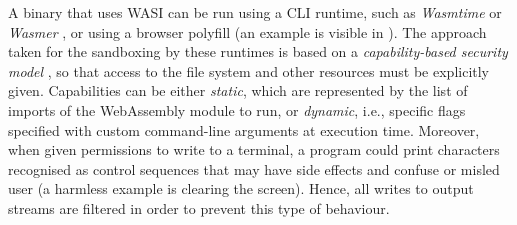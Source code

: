 A binary that uses WASI can be run using a CLI runtime, such as \textit{Wasmtime} \cite{wasmtime} or \textit{Wasmer} \cite{wasmer},
or using a browser polyfill (an example is visible in \cite{wasi-polyfill}).
The approach taken for the sandboxing by these runtimes is based on a \textit{capability-based security model} \cite{wasmtime-security-sandboxing},
so that access to the file system and other resources must be explicitly given. Capabilities can be either \textit{static}, which
are represented by the list of imports of the WebAssembly module to run, or \textit{dynamic}, i.e., specific flags
specified with custom command-line arguments at execution time.
Moreover, when given permissions to write to a terminal, a program could print characters recognised as control
sequences that may have side effects and confuse or misled user (a harmless example is clearing the screen).
Hence, all writes to output streams are filtered in order to prevent this type of behaviour.

